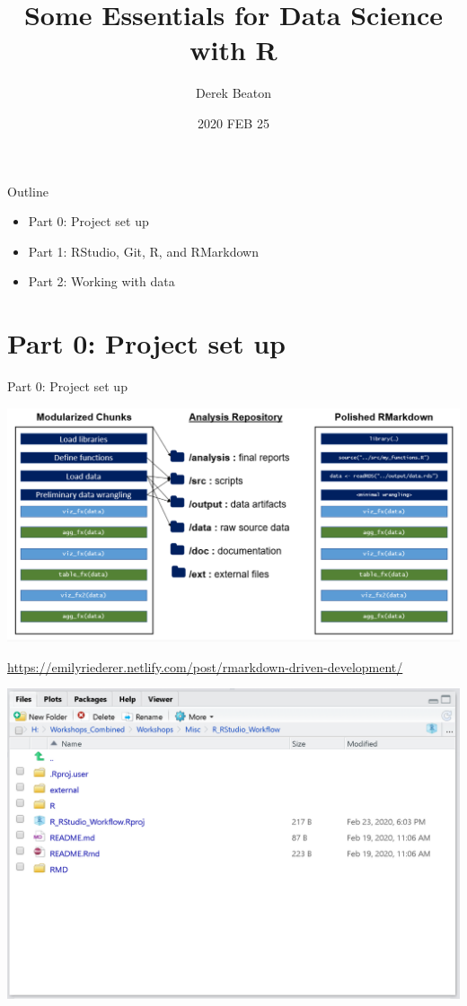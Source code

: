 \documentclass[
  ignorenonframetext,
]{beamer}
\title{Some Essentials for Data Science with R}
\author{Derek Beaton}
\date{2020 FEB 25}
\providecommand{\tightlist}{%
  \setlength{\itemsep}{0pt}\setlength{\parskip}{0pt}}
\begin{document}
\frame{\titlepage}

\begin{frame}{Outline}
\protect\hypertarget{outline}{}

\begin{itemize}[<+->]
\tightlist
\item
  Part 0: Project set up
\item
  Part 1: RStudio, Git, R, and RMarkdown
\item
  Part 2: Working with data
\end{itemize}

\end{frame}

\hypertarget{part-0-project-set-up}{%
\section{Part 0: Project set up}\label{part-0-project-set-up}}

\begin{frame}{Part 0: Project set up}

\includegraphics{../external/images/setup_4_markdown_project.PNG}

\url{https://emilyriederer.netlify.com/post/rmarkdown-driven-development/}

\end{frame}

\begin{frame}

\includegraphics{../external/images/this_project.PNG}

\end{frame}
\end{document}
